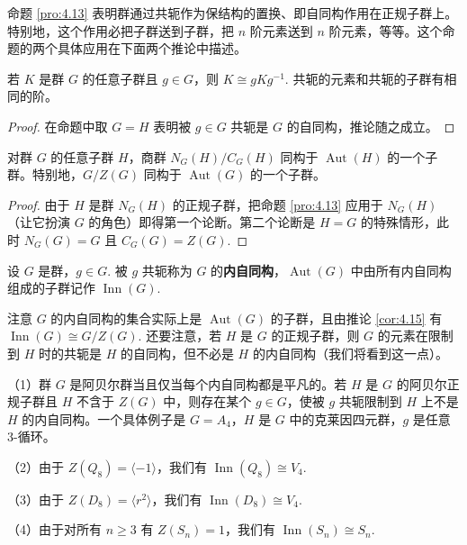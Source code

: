 命题 \ref{pro:4.13} 表明群通过共轭作为保结构的置换、即自同构作用在正规子群上。特别地，这个作用必把子群送到子群，把 \(n\) 阶元素送到 \(n\) 阶元素，等等。这个命题的两个具体应用在下面两个推论中描述。

\begin{corollary}\label{cor:4.14}
若 \(K\) 是群 \(G\) 的任意子群且 \(g \in G\)，则 \(K \cong gKg^{-1}\). 共轭的元素和共轭的子群有相同的阶。
\end{corollary}

\begin{proof}
在命题中取 \(G = H\) 表明被 \(g \in G\) 共轭是 \(G\) 的自同构，推论随之成立。
\end{proof}

\begin{corollary}\label{cor:4.15}
对群 \(G\) 的任意子群 \(H\)，商群 \(N_G(H)/C_G(H)\) 同构于 \(\operatorname{Aut}(H)\) 的一个子群。特别地，\(G/Z(G)\) 同构于 \(\operatorname{Aut}(G)\) 的一个子群。
\end{corollary}

\begin{proof}
由于 \(H\) 是群 \(N_G(H)\) 的正规子群，把命题 \ref{pro:4.13} 应用于 \(N_G(H)\)（让它扮演 \(G\) 的角色）即得第一个论断。第二个论断是 \(H = G\) 的特殊情形，此时 \(N_G(G) = G\) 且 \(C_G(G) = Z(G)\).
\end{proof}

\begin{definition}
设 \(G\) 是群，\(g \in G\). 被 \(g\) 共轭称为 \(G\) 的\textbf{内自同构}，\(\operatorname{Aut}(G)\) 中由所有内自同构组成的子群记作 \(\operatorname{Inn}(G)\).
\end{definition}

注意 \(G\) 的内自同构的集合实际上是 \(\operatorname{Aut}(G)\) 的子群，且由推论 \ref{cor:4.15} 有 \(\operatorname{Inn}(G) \cong G/Z(G)\). 还要注意，若 \(H\) 是 \(G\) 的正规子群，则 \(G\) 的元素在限制到 \(H\) 时的共轭是 \(H\) 的自同构，但不必是 \(H\) 的内自同构（我们将看到这一点）。

\begin{example}
（1）群 \(G\) 是阿贝尔群当且仅当每个内自同构都是平凡的。若 \(H\) 是 \(G\) 的阿贝尔正规子群且 \(H\) 不含于 \(Z(G)\) 中，则存在某个 \(g \in G\)，使被 \(g\) 共轭限制到 \(H\) 上不是 \(H\) 的内自同构。一个具体例子是 \(G = A_4\)，\(H\) 是 \(G\) 中的克莱因四元群，\(g\) 是任意 3-循环。

（2）由于 \(Z(Q_8) = \langle -1 \rangle\)，我们有 \(\operatorname{Inn}(Q_8) \cong V_4\).

（3）由于 \(Z(D_8) = \langle r^2 \rangle\)，我们有 \(\operatorname{Inn}(D_8) \cong V_4\).

（4）由于对所有 \(n \geq 3\) 有 \(Z(S_n) = 1\)，我们有 \(\operatorname{Inn}(S_n) \cong S_n\).
\end{example}

